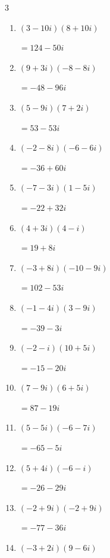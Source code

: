 \begin{multicols}{3}
\begin{enumerate}
  \item $\displaystyle (3-10i)(8+10i)$

        $\displaystyle =124-50i$

  \item $\displaystyle (9+3i)(-8-8i)$

        $\displaystyle =-48-96i$

  \item $\displaystyle (5-9i)(7+2i)$

        $\displaystyle =53-53i$

  \item $\displaystyle (-2-8i)(-6-6i)$

        $\displaystyle =-36+60i$

\columnbreak %

  \item $\displaystyle (-7-3i)(1-5i)$

        $\displaystyle =-22+32i$

  \item $\displaystyle (4+3i)(4-i)$

        $\displaystyle =19+8i$

  \item $\displaystyle (-3+8i)(-10-9i)$

        $\displaystyle =102-53i$

  \item $\displaystyle (-1-4i)(3-9i)$

        $\displaystyle =-39-3i$

  \item $\displaystyle (-2-i)(10+5i)$

        $\displaystyle =-15-20i$

  \item $\displaystyle (7-9i)(6+5i)$

        $\displaystyle =87-19i$

  \item $\displaystyle (5-5i)(-6-7i)$

        $\displaystyle =-65-5i$

  \item $\displaystyle (5+4i)(-6-i)$

        $\displaystyle =-26-29i$

  \item $\displaystyle (-2+9i)(-2+9i)$

        $\displaystyle =-77-36i$

  \item $\displaystyle (-3+2i)(9-6i)$


\end{enumerate}
\end{multicols}
